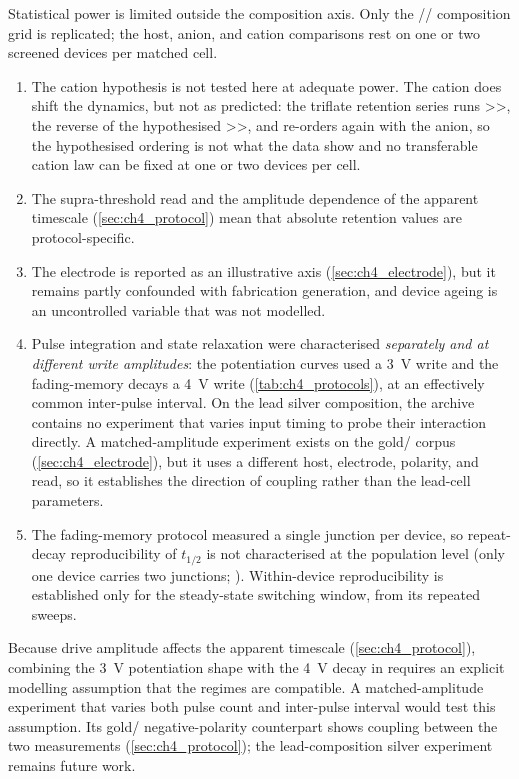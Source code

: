 \documentclass[12pt, twoside]{report}
\begin{document}
Statistical power is limited outside the composition axis. Only the \SY{}/\PEO{}/\LiTf{} composition grid is replicated; the host, anion, and cation comparisons rest on one or two screened devices per matched cell.
\begin{enumerate}
  \item The cation hypothesis is not tested here at adequate power. The cation does shift the dynamics, but not as predicted: the triflate retention series runs >>, the reverse of the hypothesised >>, and re-orders again with the anion, so the hypothesised ordering is not what the data show and no transferable cation law can be fixed at one or two devices per cell.
  \item The supra-threshold read and the amplitude dependence of the apparent timescale (\cref{sec:ch4_protocol}) mean that absolute retention values are protocol-specific.
  \item The electrode is reported as an illustrative axis (\cref{sec:ch4_electrode}), but it remains partly confounded with fabrication generation, and device ageing is an uncontrolled variable that was not modelled.
  \item Pulse integration and state relaxation were characterised \emph{separately and at different write amplitudes}: the potentiation curves used a \SI{3}{\volt} write and the fading-memory decays a \SI{4}{\volt} write (\cref{tab:ch4_protocols}), at an effectively common inter-pulse interval. On the lead silver composition, the archive contains no experiment that varies input timing to probe their interaction directly. A matched-amplitude experiment exists on the gold/\TMPE{} corpus (\cref{sec:ch4_electrode}), but it uses a different host, electrode, polarity, and read, so it establishes the direction of coupling rather than the lead-cell parameters.
  \item The fading-memory protocol measured a single junction per device, so repeat-decay reproducibility of \(t_{1/2}\) is not characterised at the population level (only one device carries two junctions; ). Within-device reproducibility is established only for the steady-state switching window, from its repeated sweeps.
\end{enumerate}
Because drive amplitude affects the apparent timescale (\cref{sec:ch4_protocol}), combining the \SI{3}{\volt} potentiation shape with the \SI{4}{\volt} decay in  requires an explicit modelling assumption that the regimes are compatible. A matched-amplitude experiment that varies both pulse count and inter-pulse interval would test this assumption. Its gold/\TMPE{} negative-polarity counterpart shows coupling between the two measurements (\cref{sec:ch4_protocol}); the lead-composition silver experiment remains future work.
\end{document}
